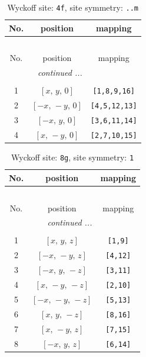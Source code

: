 \documentclass[fleqn,8pt]{jsarticle}
\begin{document}
\renewcommand{\arraystretch}{1.2}
\begin{longtable}{ccc}
\caption{Wyckoff site: {\tt 4f}, site symmetry: {\tt ..m}}
 \\
 \hline \hline
No. & position & mapping \\ \hline \endfirsthead

\multicolumn{2}{l}{\tablename\ \thetable{}} \\
 \hline \hline
No. & position & mapping \\ \hline \endhead

 \hline \hline
\multicolumn{2}{r}{\footnotesize\it continued ...} \\ \endfoot

 \hline \hline
\multicolumn{2}{r}{} \\ \endlastfoot

1 & $\left[ x,\, y,\, 0 \right]$ & {\tt [1,8,9,16]} \\ \hline
2 & $\left[ - x,\, - y,\, 0 \right]$ & {\tt [4,5,12,13]} \\ \hline
3 & $\left[ - x,\, y,\, 0 \right]$ & {\tt [3,6,11,14]} \\ \hline
4 & $\left[ x,\, - y,\, 0 \right]$ & {\tt [2,7,10,15]} \\
\end{longtable}
\renewcommand{\arraystretch}{1.2}
\begin{longtable}{ccc}
\caption{Wyckoff site: {\tt 8g}, site symmetry: {\tt 1}}
 \\
 \hline \hline
No. & position & mapping \\ \hline \endfirsthead

\multicolumn{2}{l}{\tablename\ \thetable{}} \\
 \hline \hline
No. & position & mapping \\ \hline \endhead

 \hline \hline
\multicolumn{2}{r}{\footnotesize\it continued ...} \\ \endfoot

 \hline \hline
\multicolumn{2}{r}{} \\ \endlastfoot

1 & $\left[ x,\, y,\, z \right]$ & {\tt [1,9]} \\ \hline
2 & $\left[ - x,\, - y,\, z \right]$ & {\tt [4,12]} \\ \hline
3 & $\left[ - x,\, y,\, - z \right]$ & {\tt [3,11]} \\ \hline
4 & $\left[ x,\, - y,\, - z \right]$ & {\tt [2,10]} \\ \hline
5 & $\left[ - x,\, - y,\, - z \right]$ & {\tt [5,13]} \\ \hline
6 & $\left[ x,\, y,\, - z \right]$ & {\tt [8,16]} \\ \hline
7 & $\left[ x,\, - y,\, z \right]$ & {\tt [7,15]} \\ \hline
8 & $\left[ - x,\, y,\, z \right]$ & {\tt [6,14]} \\
\end{longtable}
\end{document}
